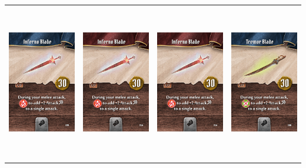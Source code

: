 \documentclass{minimal}
\begin{document}
{\begin{longtable}{llll}
\includegraphics[width=44mm,height=68mm]{./64-151/gh-079a-inferno-blade.png} &
\includegraphics[width=44mm,height=68mm]{./64-151/gh-079b-inferno-blade.png} &
\includegraphics[width=44mm,height=68mm]{./64-151/gh-079b-inferno-blade.png} &
\includegraphics[width=44mm,height=68mm]{./64-151/gh-080a-tremor-blade.png}\\ 

\end{longtable}}
\end{document}
